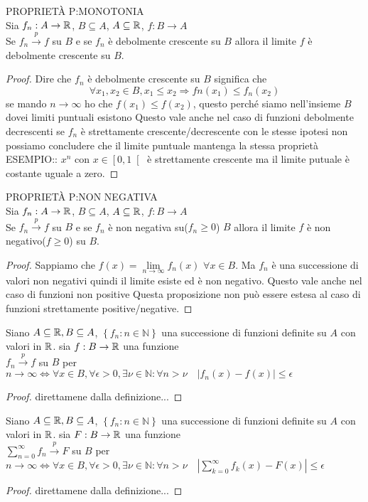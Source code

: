 \proposition PROPRIETÀ P:MONOTONIA\\
Sia $f_n:A\to \mathbb{R}$, $B\subseteq A$, $A\subseteq \mathbb{R}$, $f:B\to A$\\
Se $f_n\overset{p}{\to}f$ su $B$ e se $f_n$ è debolmente crescente su $B$ allora il limite $f$ è debolmente crescente su $B$.
\begin{proof}
	Dire che $f_n$ è debolmente crescente su $B$ significa che $$\forall x_1,x_2\in B, x_1\le x_2 \Rightarrow fn(x_1)\le f_n(x_2)$$
	se mando $n\to\infty$ ho che $f(x_1)\le f(x_2)$, questo perché siamo nell'insieme $B$ dovei limiti puntuali esistono
	\observation
	Questo vale anche nel caso di funzioni debolmente decrescenti
	\observation
	se $f_n$ è strettamente crescente/decrescente con le stesse ipotesi non possiamo concludere che il limite puntuale mantenga la stessa proprietà\\
	ESEMPIO:: $x^n$ con $x\in\left[0,1\right[$ è strettamente crescente ma il limite putuale è costante uguale a zero.
\end{proof}
\proposition PROPRIETÀ P:NON NEGATIVA\\
Sia $f_n:A\to \mathbb{R}$, $B\subseteq A$, $A\subseteq \mathbb{R}$, $f:B\to A$\\
Se $f_n\overset{p}{\to}f$ su $B$ e se $f_n$ è non negativa su($f_n\ge 0$) $B$ allora il limite $f$ è non negativo($f\ge 0$) su $B$.
\begin{proof}
 	Sappiamo che $f(x)=\lim\limits_{n\to\infty}f_n(x)$ $\forall x\in B$.
 	Ma $f_n$ è una successione di valori non negativi quindi il limite esiste ed è non negativo.
	\observation
	Questo vale anche nel caso di funzioni non positive
	\observation
	Questa proposizione non può essere estesa al caso di funzioni strettamente positive/negative.
\end{proof}
\proposition
Siano $A\subseteq \mathbb{R}, B\subseteq A$, $\left\{f_n:n\in\mathbb{N}\right\}$ una successione di funzioni definite su $A$ con valori in $ \mathbb{R}$. sia $f:B\to \mathbb{R}$ una funzione\\
$f_n\overset{p}{\to}f$ su $B$ per $n\to\infty \Leftrightarrow \forall x\in B,\forall \epsilon >0,\exists\nu\in\mathbb{N}:\forall n>\nu \quad \left|f_n(x)-f(x)\right|\le \epsilon$
\begin{proof}
	direttamene dalla definizione...
\end{proof}
\proposition
Siano $A\subseteq \mathbb{R}, B\subseteq A$, $\left\{f_n:n\in\mathbb{N}\right\}$ una successione di funzioni definite su $A$ con valori in $ \mathbb{R}$. sia $F:B\to \mathbb{R}$ una funzione\\
$\sum\limits_{n=0}^{\infty}f_n\overset{p}{\to}F$ su $B$ per $n\to\infty \Leftrightarrow \forall x\in B,\forall \epsilon >0,\exists\nu\in\mathbb{N}:\forall n>\nu \quad \left|\sum\limits_{k=0}^{\infty}f_k(x)-F(x)\right|\le \epsilon$
\begin{proof}
	direttamene dalla definizione...
\end{proof}

